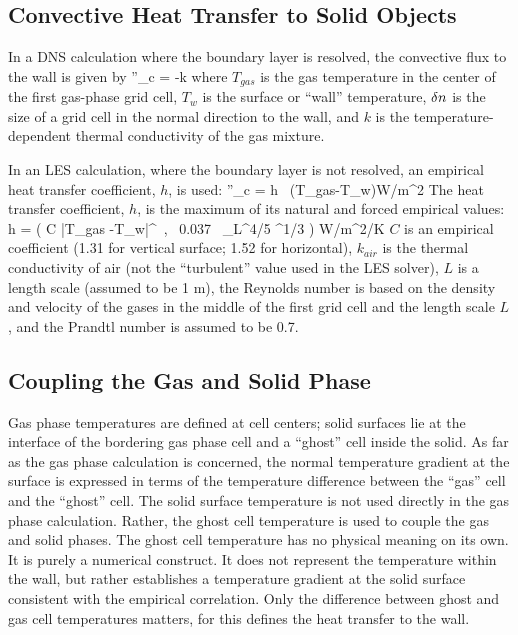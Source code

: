 \documentclass[11pt]{book}
\begin{document}
\subsection{Convective Heat Transfer to Solid Objects}

In a DNS calculation where the boundary layer is resolved, the convective flux to the wall
is given by
\be
\dq''_c = -k 
\ee
where $T_{gas}$ is the gas temperature in the center of the first gas-phase grid cell,
$T_w$ is the surface or ``wall'' temperature, $\delta n$ is the
size of a grid cell in the normal direction to the wall, and $k$ is
the temperature-dependent thermal conductivity of the gas mixture.

In an LES calculation, where the boundary layer is not resolved, an empirical heat transfer coefficient, $h$, is used: \be \dq''_c = h \,
(T_{gas}-T_w)\quad \hbox{W/m}^2 \ee The heat transfer coefficient, $h$, is the maximum of its natural and forced empirical values:
 \be h = \max \left( C |T_{gas} -T_w|^\ot \, , \,  0.037 \, \RE_L^{4/5} \PR^{1/3} \right)  \quad \hbox{W/m}^2\hbox{/K}  \ee
$C$ is an empirical coefficient (1.31 for vertical surface; 1.52 for horizontal), $k_{air}$ is
the thermal conductivity of air (not the ``turbulent''
value used in the LES solver), $L$ is a length scale (assumed to be 1 m), the Reynolds number
is based on the density and velocity of the gases in
the middle of the first grid cell and the length scale $L$, and the Prandtl number is assumed to be 0.7.


\subsection{Coupling the Gas and Solid Phase}

Gas phase temperatures are defined at cell centers; solid surfaces lie at the
interface of the bordering gas phase cell and a ``ghost'' cell inside the
solid. As far as the gas phase calculation is concerned,
the normal temperature gradient at the surface is expressed in terms of
the temperature difference between the ``gas'' cell and the ``ghost'' cell.
The solid surface temperature is not used directly in the gas phase calculation.
Rather, the ghost cell temperature is used to couple the gas and solid phases.
The ghost cell temperature
has no physical meaning on its own. It is purely a numerical construct. It does
not represent the temperature within the wall, but rather establishes
a temperature gradient at the solid surface consistent with the empirical
correlation. Only the difference between ghost and
gas cell temperatures matters, for this defines the heat transfer to the
wall.
\end{document}
